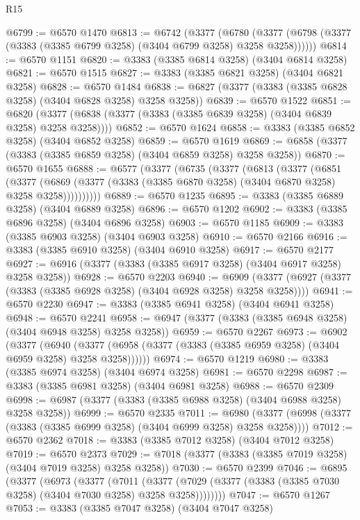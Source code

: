 \begin{lexlean}{R15}
\begin{coremodule}
@6799 := @6570 @1470
@6813 := @6742
    (@3377
      (@6780 (@3377 (@6798 (@3377 (@3383 (@3385 @6799 @3258) (@3404 @6799 @3258) @3258 @3258))))))
@6814 := @6570 @1151
@6820 := @3383 (@3385 @6814 @3258) (@3404 @6814 @3258)
@6821 := @6570 @1515
@6827 := @3383 (@3385 @6821 @3258) (@3404 @6821 @3258)
@6828 := @6570 @1484
@6838 := @6827 (@3377 (@3383 (@3385 @6828 @3258) (@3404 @6828 @3258) @3258 @3258))
@6839 := @6570 @1522
@6851 := @6820 (@3377 (@6838 (@3377 (@3383 (@3385 @6839 @3258) (@3404 @6839 @3258) @3258 @3258))))
@6852 := @6570 @1624
@6858 := @3383 (@3385 @6852 @3258) (@3404 @6852 @3258)
@6859 := @6570 @1619
@6869 := @6858 (@3377 (@3383 (@3385 @6859 @3258) (@3404 @6859 @3258) @3258 @3258))
@6870 := @6570 @1655
@6888 := @6577
    (@3377
      (@6735
        (@3377
          (@6813
            (@3377
              (@6851
                (@3377
                  (@6869 (@3377 (@3383 (@3385 @6870 @3258) (@3404 @6870 @3258) @3258 @3258))))))))))
@6889 := @6570 @1235
@6895 := @3383 (@3385 @6889 @3258) (@3404 @6889 @3258)
@6896 := @6570 @1202
@6902 := @3383 (@3385 @6896 @3258) (@3404 @6896 @3258)
@6903 := @6570 @1185
@6909 := @3383 (@3385 @6903 @3258) (@3404 @6903 @3258)
@6910 := @6570 @2166
@6916 := @3383 (@3385 @6910 @3258) (@3404 @6910 @3258)
@6917 := @6570 @2177
@6927 := @6916 (@3377 (@3383 (@3385 @6917 @3258) (@3404 @6917 @3258) @3258 @3258))
@6928 := @6570 @2203
@6940 := @6909 (@3377 (@6927 (@3377 (@3383 (@3385 @6928 @3258) (@3404 @6928 @3258) @3258 @3258))))
@6941 := @6570 @2230
@6947 := @3383 (@3385 @6941 @3258) (@3404 @6941 @3258)
@6948 := @6570 @2241
@6958 := @6947 (@3377 (@3383 (@3385 @6948 @3258) (@3404 @6948 @3258) @3258 @3258))
@6959 := @6570 @2267
@6973 := @6902
    (@3377
      (@6940 (@3377 (@6958 (@3377 (@3383 (@3385 @6959 @3258) (@3404 @6959 @3258) @3258 @3258))))))
@6974 := @6570 @1219
@6980 := @3383 (@3385 @6974 @3258) (@3404 @6974 @3258)
@6981 := @6570 @2298
@6987 := @3383 (@3385 @6981 @3258) (@3404 @6981 @3258)
@6988 := @6570 @2309
@6998 := @6987 (@3377 (@3383 (@3385 @6988 @3258) (@3404 @6988 @3258) @3258 @3258))
@6999 := @6570 @2335
@7011 := @6980 (@3377 (@6998 (@3377 (@3383 (@3385 @6999 @3258) (@3404 @6999 @3258) @3258 @3258))))
@7012 := @6570 @2362
@7018 := @3383 (@3385 @7012 @3258) (@3404 @7012 @3258)
@7019 := @6570 @2373
@7029 := @7018 (@3377 (@3383 (@3385 @7019 @3258) (@3404 @7019 @3258) @3258 @3258))
@7030 := @6570 @2399
@7046 := @6895
    (@3377
      (@6973
        (@3377
          (@7011
            (@3377 (@7029 (@3377 (@3383 (@3385 @7030 @3258) (@3404 @7030 @3258) @3258 @3258))))))))
@7047 := @6570 @1267
@7053 := @3383 (@3385 @7047 @3258) (@3404 @7047 @3258)

\end{coremodule}
\end{lexlean}
